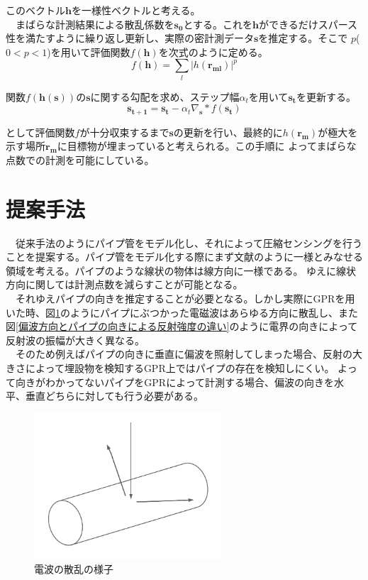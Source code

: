 \documentclass[12pt,a4paper]{jsreport}
\begin{document}
このベクトル$\bm{h}$を一様性ベクトルと考える。
\\　まばらな計測結果による散乱係数を$\bm{s_{0}}$とする。これを$\bm{h}$ができるだけスパース性を満たすように繰り返し更新し、実際の密計測データ$\bm{s}$を推定する。そこで
$p$($0<p<1$)を用いて評価関数$f(\bm{h})$を次式のように定める。
\begin{equation}
  f(\bm{h})=\sum_{l}|h(\bm{r_{ml}})|^{p}
  \end{equation}

関数$f(\bm{h({\bm{s}})})$の$\bm{s}$に関する勾配を求め、ステップ幅$\alpha_{t}$を用いて$\bm{s_{t}}$を更新する。
\begin{equation}
  \bm{s_{t+1}}=\bm{s_{t}}-\alpha_{t}\nabla_{\bm{s}}*f(\bm{s_{t}})
  \end{equation}

として評価関数$f$が十分収束するまで$\bm{s}$の更新を行い、最終的に$h(\bm{r_{m}})$が極大を示す場所$\bm{r_{m}}$に目標物が埋まっていると考えられる。この手順に
よってまばらな点数での計測を可能にしている。

\section{提案手法}
　従来手法のようにパイプ管をモデル化し、それによって圧縮センシングを行うことを提案する。パイプ管をモデル化する際にまず文献\cite{imai}のように一様とみなせる領域を考える。パイプのような線状の物体は線方向に一様である。
ゆえに線状方向に関しては計測点数を減らすことが可能となる。
\\　それゆえパイプの向きを推定することが必要となる。しかし実際にGPRを用いた時、図\ref{電波の散乱の様子}のようにパイプにぶつかった電磁波はあらゆる方向に散乱し、また
図\ref{偏波方向とパイプの向きによる反射強度の違い}のように電界の向きによって反射波の振幅が大きく異なる。
\\　そのため例えばパイプの向きに垂直に偏波を照射してしまった場合、反射の大きさによって埋設物を検知するGPR上ではパイプの存在を検知しにくい。
よって向きがわかってないパイプをGPRによって計測する場合、偏波の向きを水平、垂直どちらに対しても行う必要がある。

\begin{figure}[h]
  \begin{center}
   \includegraphics[width=7cm]{./image/scattering.pdf}
  \caption{電波の散乱の様子}\label{電波の散乱の様子}
  \end{center}
  \end{figure}
\end{document}
